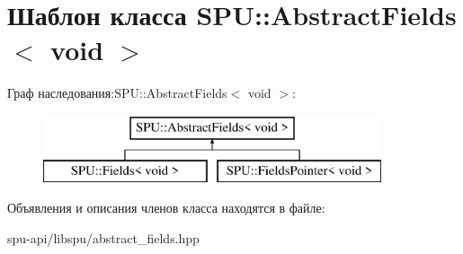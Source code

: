 \hypertarget{class_s_p_u_1_1_abstract_fields_3_01void_01_4}{}\section{Шаблон класса S\+PU\+:\+:Abstract\+Fields$<$ void $>$}
\label{class_s_p_u_1_1_abstract_fields_3_01void_01_4}
Граф наследования\+:S\+PU\+:\+:Abstract\+Fields$<$ void $>$\+:\begin{figure}[H]
\begin{center}
\leavevmode
\includegraphics[height=2.000000cm]{class_s_p_u_1_1_abstract_fields_3_01void_01_4}
\end{center}
\end{figure}


Объявления и описания членов класса находятся в файле\+:\begin{DoxyCompactItemize}
\item 
spu-\/api/libspu/abstract\+\_\+fields.\+hpp\end{DoxyCompactItemize}
